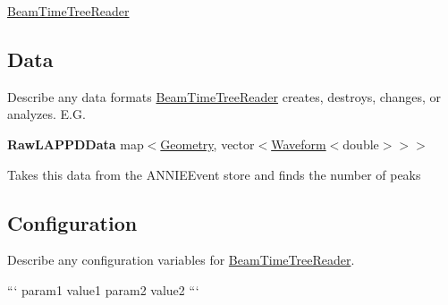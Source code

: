 \hyperlink{classBeamTimeTreeReader}{Beam\-Time\-Tree\-Reader}

\subsection*{Data}

Describe any data formats \hyperlink{classBeamTimeTreeReader}{Beam\-Time\-Tree\-Reader} creates, destroys, changes, or analyzes. E.\-G.

{\bfseries Raw\-L\-A\-P\-P\-D\-Data} {\ttfamily map$<$\hyperlink{classGeometry}{Geometry}, vector$<$\hyperlink{classWaveform}{Waveform}$<$double$>$$>$$>$}
\begin{DoxyItemize}
\item Takes this data from the {\ttfamily A\-N\-N\-I\-E\-Event} store and finds the number of peaks
\end{DoxyItemize}

\subsection*{Configuration}

Describe any configuration variables for \hyperlink{classBeamTimeTreeReader}{Beam\-Time\-Tree\-Reader}.

``` param1 value1 param2 value2 ``` 